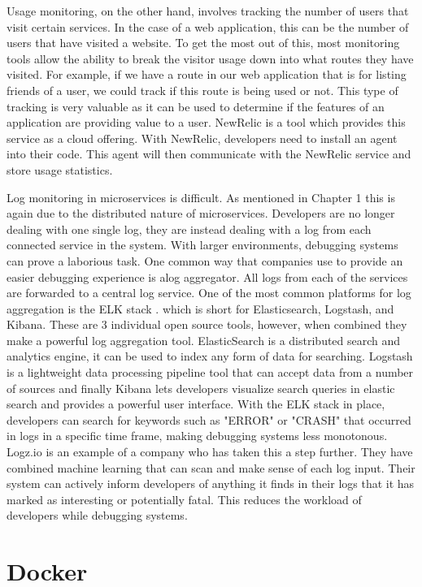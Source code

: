 Usage monitoring, on the other hand, involves tracking the number of users that visit certain services. In the case of a web application, this can be the number of users that have visited a website. To get the most out of this, most monitoring tools allow the ability to break the visitor usage down into what routes they have visited. For example, if we have a route in our web application that is for listing friends of a user, we could track if this route is being used or not. This type of tracking is very valuable as it can be used to determine if the features of an application are providing value to a user. NewRelic \cite{new-relic} is a tool which provides this service as a cloud offering. With NewRelic, developers need to install an agent into their code. This agent will then communicate with the NewRelic service and store usage statistics. 

Log monitoring in microservices is difficult. As mentioned in Chapter 1 this is again due to the distributed nature of microservices. Developers are no longer dealing with one single log, they are instead dealing with a log from each connected service in the system. With larger environments, debugging systems can prove a laborious task. One common way that companies use to provide an easier debugging experience is alog aggregator. All logs from each of the services are forwarded to a central log service. One of the most common platforms for log aggregation is the ELK stack \cite{8311756}. which is short for Elasticsearch, Logstash, and Kibana. These are 3 individual open source tools, however, when combined they make a powerful log aggregation tool. ElasticSearch is a distributed search and analytics engine, it can be used to index any form of data for searching. Logstash is a lightweight data processing pipeline tool that can accept data from a number of sources and finally Kibana lets developers visualize search queries in elastic search and provides a powerful user interface. With the ELK stack in place, developers can search for keywords such as "ERROR" or "CRASH" that occurred in logs in a specific time frame, making debugging systems less monotonous. Logz.io \cite{logzio} is an example of a company who has taken this a step further. They have combined machine learning that can scan and make sense of each log input. Their system can actively inform developers of anything it finds in their logs that it has marked as interesting or potentially fatal. This reduces the workload of developers while debugging systems.

\section{Docker}

